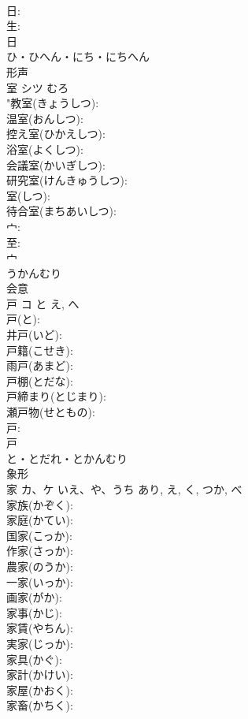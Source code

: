 \documentclass[8pt]{extreport}
\begin{document}
\begin{CJK}{UTF8}{min}
\\	日: 
\\	生: 
\\	日	
\\	ひ・ひへん・にち・にちへん	
\\	形声 
\\	室	シツ	むろ		
\\	"教室(きょうしつ): 
\\	温室(おんしつ): 
\\	控え室(ひかえしつ): 
\\	浴室(よくしつ): 
\\	会議室(かいぎしつ): 
\\	研究室(けんきゅうしつ): 
\\	室(しつ): 
\\	待合室(まちあいしつ): 
\\	宀: 
\\	至: 
\\	宀	
\\	うかんむり	
\\	会意 
\\	戸	コ	と	え, へ	
\\	戸(と): 
\\	井戸(いど): 
\\	戸籍(こせき): 
\\	雨戸(あまど): 
\\	戸棚(とだな): 
\\	戸締まり(とじまり): 
\\	瀬戸物(せともの): 
\\	戸: 
\\	戸	
\\	と・とだれ・とかんむり	
\\	象形 
\\	家	カ、ケ	いえ、や、うち	あり, え, く, つか, べ	
\\	家族(かぞく): 
\\	家庭(かてい): 
\\	国家(こっか): 
\\	作家(さっか): 
\\	農家(のうか): 
\\	一家(いっか): 
\\	画家(がか): 
\\	家事(かじ): 
\\	家賃(やちん): 
\\	実家(じっか): 
\\	家具(かぐ): 
\\	家計(かけい): 
\\	家屋(かおく): 
\\	家畜(かちく): 

\end{CJK}
\end{document}
